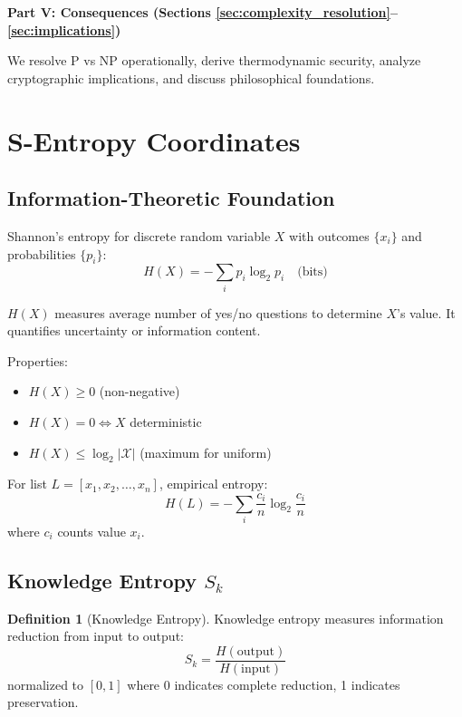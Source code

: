 \documentclass[twocolumn,10pt]{revtex4-2}
\theoremstyle{definition}
\newtheorem{definition}[theorem]{Definition}
\theoremstyle{remark}
\newcommand{\Sk}{S_k}
\begin{document}
\vspace{0.2cm}
\noindent\textbf{Part V: Consequences (Sections \ref{sec:complexity_resolution}--\ref{sec:implications})}

We resolve P vs NP operationally, derive thermodynamic security, analyze cryptographic implications, and discuss philosophical foundations.

\section{S-Entropy Coordinates}
\label{sec:s_entropy}

\subsection{Information-Theoretic Foundation}

Shannon's entropy \cite{Shannon1948} for discrete random variable $X$ with outcomes $\{x_i\}$ and probabilities $\{p_i\}$:
\begin{equation}
H(X) = -\sum_{i} p_i \log_2 p_i \quad \text{(bits)}
\label{eq:shannon_entropy}
\end{equation}

\noindent $H(X)$ measures average number of yes/no questions to determine $X$'s value. It quantifies uncertainty or information content.

Properties:
\begin{itemize}
\item $H(X) \geq 0$ (non-negative)
\item $H(X) = 0 \iff X$ deterministic
\item $H(X) \leq \log_2 |\mathcal{X}|$ (maximum for uniform)
\end{itemize}

For list $L = [x_1, x_2, \ldots, x_n]$, empirical entropy:
\begin{equation}
H(L) = -\sum_{i} \frac{c_i}{n} \log_2 \frac{c_i}{n}
\label{eq:empirical_entropy}
\end{equation}
where $c_i$ counts value $x_i$.

\subsection{Knowledge Entropy $\Sk$}

\begin{definition}[Knowledge Entropy]
\label{def:knowledge_entropy}
Knowledge entropy measures information reduction from input to output:
\begin{equation}
\Sk = \frac{H(\text{output})}{H(\text{input})}
\label{eq:knowledge_entropy}
\end{equation}
normalized to $[0,1]$ where 0 indicates complete reduction, 1 indicates preservation.
\end{definition}
\end{document}
